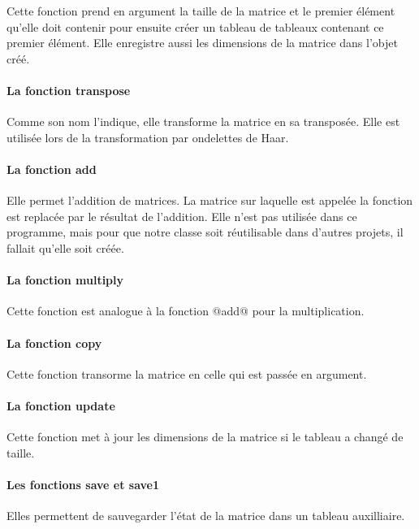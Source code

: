 \documentclass{article}
\begin{document}
Cette fonction prend en argument la taille de la matrice et le premier élément qu'elle doit contenir pour ensuite créer un tableau de tableaux contenant ce premier élément. Elle enregistre aussi les dimensions de la matrice dans l'objet créé.

\paragraph{La fonction transpose }

Comme son nom l'indique, elle transforme la matrice en sa transposée. Elle est utilisée lors de la transformation par ondelettes de Haar.

\paragraph{La fonction add}

Elle permet l'addition de matrices. La matrice sur laquelle est appelée la fonction est replacée par le résultat de l'addition. Elle n'est pas utilisée dans ce programme, mais pour que notre classe soit réutilisable dans d'autres projets, il fallait qu'elle soit créée.

\paragraph{La fonction multiply}

Cette fonction est analogue à la fonction @add@ pour la multiplication.

\paragraph{La fonction copy}

Cette fonction transorme la matrice en celle qui est passée en argument.

\paragraph{La fonction update}

Cette fonction met à jour les dimensions de la matrice si le tableau a changé de taille.

\paragraph{Les fonctions save et save1} 

Elles permettent de sauvegarder l'état de la matrice dans un tableau auxilliaire.
\end{document}
